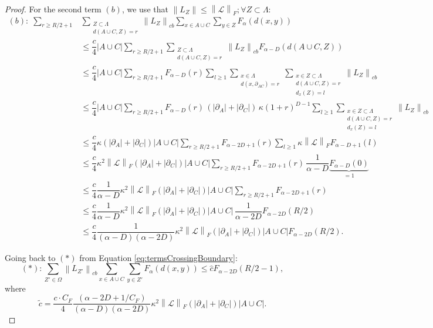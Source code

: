\documentclass[11pt]{article}
\numberwithin{equation}{section}
\numberwithin{figure}{section}
\numberwithin{table}{section}
\theoremstyle{definition}
\theoremstyle{plain}
\theoremstyle{remark}
\newcommand{\Li}{\mathcal{L}}
\newcommand{\La}{\Lambda}
\newcommand{\norm}[1]{\left\lVert#1\right\rVert}
\newcommand{\normm}[2]{\left\lVert#1\right\rVert_{#2}}
\newcommand{\abs}[1]{\left \vert#1\right\vert}
\begin{document}
\begin{proof}
For the second term $(b)$, we use that $\norm{L_Z}\leq \normm{\Li}{F};\forall Z\subset \La $:
    \begin{align}
(b):\;\sum_{r\ge R/2+1}&\sum_{\substack{Z\subset \La \\ d(A\cup C,Z)= r}}\normm{L_{Z}}{cb}\sum_{x\in A\cup C}\sum_{y\in Z}F_\alpha(d(x,y))\\
&\le \dfrac{c}{4}\abs{A\cup C}\sum_{r\ge R/2+1}\sum_{\substack{Z\subset \La \\ d(A\cup C,Z)= r}}\normm{L_{Z}}{cb}F_{\alpha-D}(d(A\cup C,Z))
\nonumber\\
&\le \dfrac{c}{4}\abs{A\cup C}\sum_{r\ge R/2+1}F_{\alpha-D}(r)\sum_{l\ge 1}\sum_{\substack{x\in \La \\ d(x,\partial_{AC})= r}}\sum_{\substack{x\in Z\subset \La \\ d(A\cup C,Z)= r \\ d_x(Z)=l}}\normm{L_{Z}}{cb}
\nonumber\\
&\le \dfrac{c}{4}\abs{A\cup C}\sum_{r\ge R/2+1}F_{\alpha-D}(r)\,(\abs{\partial_{A}}+\abs{\partial_{C}})\,\kappa(1+r)^{D-1}\sum_{l\ge 1}\sum_{\substack{x\in Z\subset \La \\ d(A\cup C,Z)= r \\ d_x(Z)=l}}\normm{L_{Z}}{cb}
\nonumber\\
&\le \dfrac{c}{4}\kappa(\abs{\partial_{A}}+\abs{\partial_{C}})\abs{A\cup C}\sum_{r\ge R/2+1}F_{\alpha-2D+1}(r)\sum_{l\ge 1}\kappa \normm{\Li}{F}F_{\alpha-D+1}(l)
\nonumber\\
&\le \dfrac{c}{4}\kappa^2 \normm{\Li}{F}(\abs{\partial_{A}}+\abs{\partial_{C}})\abs{A\cup C}\sum_{r\ge R/2+1}F_{\alpha-2D+1}(r)\,\dfrac{1}{\alpha-D}\underbrace{F_{\alpha-D}(0)}_{=1}
\nonumber\\
&\le \dfrac{c}{4}\dfrac{1}{\alpha-D}\kappa^2 \normm{\Li}{F}(\abs{\partial_{A}}+\abs{\partial_{C}})\abs{A\cup C}\sum_{r\ge R/2+1}F_{\alpha-2D+1}(r)
\nonumber\\
&\le \dfrac{c}{4}\dfrac{1}{\alpha-D}\kappa^2 \normm{\Li}{F}(\abs{\partial_{A}}+\abs{\partial_{C}})\abs{A\cup C}\,\dfrac{1}{\alpha-2D}F_{\alpha-2D}(R/2)
\nonumber\\
&\le \dfrac{c}{4}\dfrac{1}{(\alpha-D)(\alpha-2D)}\kappa^2 \normm{\Li}{F}(\abs{\partial_{A}}+\abs{\partial_{C}})\abs{A\cup C}F_{\alpha-2D}(R/2).
\nonumber
\end{align}
    
    
    Going back to $(*)$ from Equation \eqref{eq:termsCrossingBoundary}:
    \begin{equation}
        (*):\sum_{Z'\in \Omega} \normm{L_{Z'}}{cb}\sum_{x\in A\cup C}\sum_{y\in Z'}F_\alpha(d(x,y))\leq \hat{c} F_{\alpha-2D}(R/2-1),
    \end{equation}
    where
    \begin{equation}
        \tilde{c}=\dfrac{c\cdot C_F}{4}\dfrac{(\alpha-2D +1/C_F)}{(\alpha-D )(\alpha-2D)}\kappa^2 \normm{\Li}{F} (\abs{\partial_{A}}+\abs{\partial_{C}})\abs{A\cup C}.
    \end{equation}


\end{proof}
\end{document}
